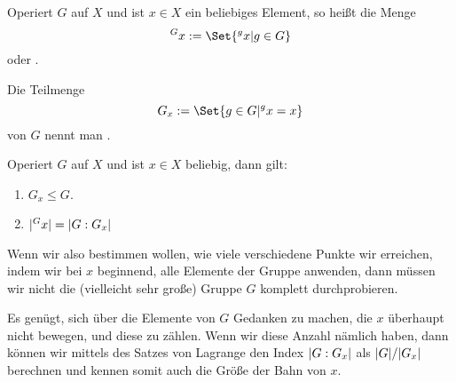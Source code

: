 \begin{definition}
Operiert $G$ auf $X$ und ist $x\in X$ ein beliebiges Element, so heißt die Menge
\[{^G x} := \Set{{^g x} | g\in G}\]
 oder .

Die Teilmenge
\[G_x := \Set{g\in G | {^g x} = x}\]
von $G$ nennt man .
\end{definition}

\begin{theorem}
Operiert $G$ auf $X$ und ist $x\in X$ beliebig, dann gilt:
\begin{enumerate}
\item $G_x\leq G$.
\item $\lvert^G x\rvert = \lvert G:G_x\rvert$
\end{enumerate}
\end{theorem}
\begin{remark}
Wenn wir also bestimmen wollen, wie viele verschiedene Punkte wir erreichen, indem wir bei $x$ beginnend, alle Elemente der Gruppe anwenden, dann müssen wir nicht die (vielleicht sehr große) Gruppe $G$ komplett durchprobieren.

Es genügt, sich über die Elemente von $G$ Gedanken zu machen, die $x$ überhaupt nicht bewegen, und diese zu zählen. Wenn wir diese Anzahl nämlich haben, dann können wir mittels des Satzes von Lagrange den Index $\lvert G:G_x\rvert$ als $\lvert G\rvert / \lvert G_x\rvert$ berechnen und kennen somit auch die Größe der Bahn von $x$.
\end{remark}

